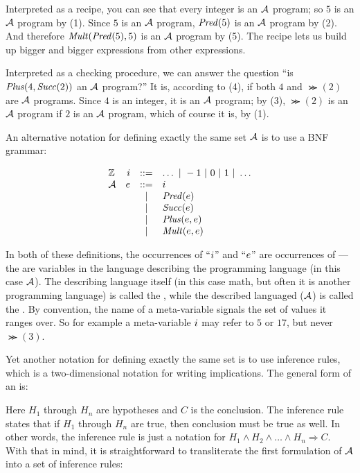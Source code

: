 Interpreted as a recipe, you can see that every integer is an
$\Arith$ program; so $5$ is an $\Arith$ program by
(1).  Since $5$ is an $\Arith$ program, $\Pred(5)$ is
an $\Arith$ program by (2).  And therefore
$\Mult(\Pred(5),5)$ is an $\Arith$ program by
(5).  The recipe lets us build up bigger and bigger expressions from
other expressions.  

Interpreted as a checking procedure, we can answer the question ``is
$\Plus(4,\Succ(2))$ an $\Arith$ program?''  It
is, according to (4), if both $4$ and $\Succ(2)$ are
$\Arith$ programs.  Since $4$ is an integer, it is an
$\Arith$ program; by (3), $\Succ(2)$ is an
$\Arith$ program if $2$ is an $\Arith$ program, which
of course it is, by (1).

An alternative notation for defining exactly the same set
$\Arith$ is to use a BNF grammar:

\[
\begin{array}{lrcll}
\mathbb{Z} 
               & \mint & ::= & \dots\ |\ -1\ |\ 0\ |\ 1\ |\ \dots\\
 \Arith 
               & e & ::= & i \\ %
               &   & |   & \Pred(e)\\
               &   & |   & \Succ(e)\\
               &   & |   & \Plus(e,e)\\
               &   & |   & \Mult(e,e)
\end{array}
\]

In both of these definitions, the occurrences of ``$\mint$'' and
``$\mexp$'' are occurrences of ---the are
variables in the language describing the programming language (in this
case $\Arith$).  The describing language itself (in this case math,
but often it is another programming language) is called the
, while the described languaged ($\Arith$) is
called the .  By convention, the name of a
meta-variable signals the set of values it ranges over.  So for
example a meta-variable $\mint$ may refer to $5$ or $17$, but never
$\Succ(3)$.

Yet another notation for defining exactly the same set is to use
inference rules, which is a two-dimensional notation for writing
implications.  The general form of an  is:
\begin{mathpar}
\end{mathpar}
Here $H_1$ through $H_n$ are hypotheses and $C$ is the conclusion.
The inference rule states that if $H_1$ through $H_n$ are true, then
conclusion must be true as well.  In other words, the inference rule
is just a notation for $H_1 \wedge H_2 \wedge \dots \wedge H_n
\Rightarrow C$.  With that in mind, it is straightforward to
transliterate the first formulation of $\Arith$ into a set of
inference rules:

